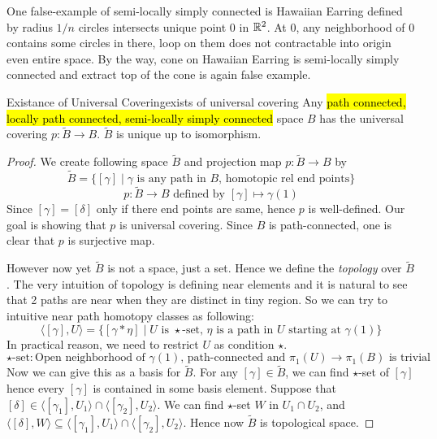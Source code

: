 \documentclass[12pt, a4paper, twoside]{article}
\theoremstyle{plain}
\begin{document}
One false-example of semi-locally simply connected is Hawaiian Earring defined by 
radius $1/n$ circles intersects unique point $0$ in ${\mathbb {R}}^2$. At $0$, any neighborhood of $0$ contains 
some circles in there, loop on them does not contractable into origin even entire space.
By the way, cone on Hawaiian Earring is semi-locally simply connected and extract top of the cone is again false example. 

\begin{thm}{Existance of Universal Covering}{exists of universal covering}
    Any \hl{path connected, locally path connected, semi-locally simply connected} space $B$ has the universal covering $p: \tilde{B} \rightarrow B$.
    $\tilde{B}$ is unique up to isomorphism.
\end{thm}

\begin{proof}
       We create following space $\tilde{B}$ and projection map $p: \tilde{B} \rightarrow B$ by 
    \[\tilde{B} = \{[\gamma] \mid \gamma \text{ is any path in $B$, homotopic rel end points}\}\]
    \[p: \tilde{B} \rightarrow B \text{ defined by } [\gamma] \mapsto \gamma(1)\]
    Since $[\gamma] = [\delta]$ only if there end points are same, hence $p$ is well-defined. Our goal is showing that 
    $p$ is universal covering. Since $B$ is path-connected, one is clear that $p$ is surjective map. 

    However now yet $\tilde{B}$ is not a space, just a set. 
    Hence we define the \textit{topology} over $\tilde{B}$. 
    The very intuition of topology is defining near elements and it is natural to see that 
    2 paths are near when they are distinct in tiny region. 
    So we can try to intuitive near path homotopy classes as following: 
    \[\langle [\gamma], U \rangle = \{[\gamma * \eta] \mid \text{$U$ is $\star$-set, }\eta \text{ is a path in $U$ starting at $\gamma(1)$}\}\]
    In practical reason, we need to restrict $U$ as condition $\star$. 
    \[\text{$\star$-set}: \text{Open neighborhood of $\gamma(1)$, path-connected and $\pi_1(U) \rightarrow \pi_1(B)$ is trivial }\]
    Now we can give this as a basis for $\tilde{B}$. 
    For any $[\gamma] \in \tilde{B}$, we can find $\star$-set of $[\gamma]$ hence every $[\gamma]$ 
    is contained in some basis element. Suppose that $[\delta] \in \langle [\gamma_1], U_1 \rangle \cap \langle [\gamma_2], U_2 \rangle$. 
    We can find $\star$-set $W$ in $U_1 \cap U_2$, and $\langle [\delta], W \rangle \subseteq \langle [\gamma_1], U_1 \rangle \cap \langle [\gamma_2], U_2 \rangle$. 
    Hence now $\tilde{B}$ is topological space. 


\end{proof}
\end{document}
